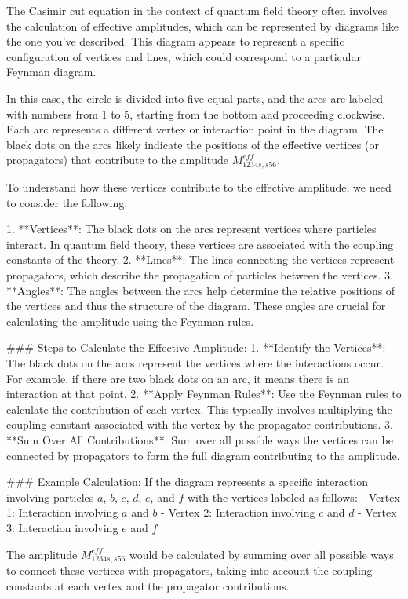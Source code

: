 The Casimir cut equation in the context of quantum field theory often involves the calculation of effective amplitudes, which can be represented by diagrams like the one you've described. This diagram appears to represent a specific configuration of vertices and lines, which could correspond to a particular Feynman diagram.

In this case, the circle is divided into five equal parts, and the arcs are labeled with numbers from 1 to 5, starting from the bottom and proceeding clockwise. Each arc represents a different vertex or interaction point in the diagram. The black dots on the arcs likely indicate the positions of the effective vertices (or propagators) that contribute to the amplitude \(M_{1234s,s56}^{eff}\).

To understand how these vertices contribute to the effective amplitude, we need to consider the following:

1. **Vertices**: The black dots on the arcs represent vertices where particles interact. In quantum field theory, these vertices are associated with the coupling constants of the theory.
2. **Lines**: The lines connecting the vertices represent propagators, which describe the propagation of particles between the vertices.
3. **Angles**: The angles between the arcs help determine the relative positions of the vertices and thus the structure of the diagram. These angles are crucial for calculating the amplitude using the Feynman rules.

### Steps to Calculate the Effective Amplitude:
1. **Identify the Vertices**: The black dots on the arcs represent the vertices where the interactions occur. For example, if there are two black dots on an arc, it means there is an interaction at that point.
2. **Apply Feynman Rules**: Use the Feynman rules to calculate the contribution of each vertex. This typically involves multiplying the coupling constant associated with the vertex by the propagator contributions.
3. **Sum Over All Contributions**: Sum over all possible ways the vertices can be connected by propagators to form the full diagram contributing to the amplitude.

### Example Calculation:
If the diagram represents a specific interaction involving particles \(a\), \(b\), \(c\), \(d\), \(e\), and \(f\) with the vertices labeled as follows:
- Vertex 1: Interaction involving \(a\) and \(b\)
- Vertex 2: Interaction involving \(c\) and \(d\)
- Vertex 3: Interaction involving \(e\) and \(f\)

The amplitude \(M_{1234s,s56}^{eff}\) would be calculated by summing over all possible ways to connect these vertices with propagators, taking into account the coupling constants at each vertex and the propagator contributions.


